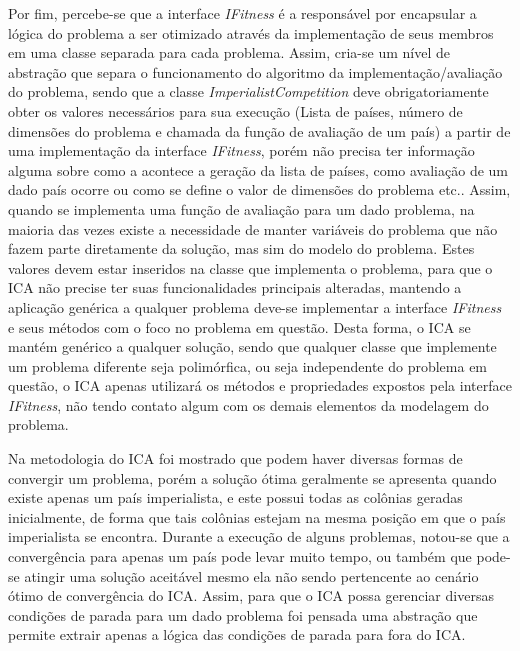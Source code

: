 Por fim, percebe-se que a interface \emph{IFitness} é a responsável por encapsular a lógica do problema a ser otimizado através da implementação de seus membros em uma classe separada para cada problema. Assim, cria-se um nível de abstração que separa o funcionamento do algoritmo da implementação/avaliação do problema, sendo que a classe \emph{ImperialistCompetition} deve obrigatoriamente obter os valores necessários para sua execução (Lista de países, número de dimensões do problema e chamada da função de avaliação de um país) a partir de uma implementação da interface \emph{IFitness}, porém não precisa ter informação alguma sobre como a acontece a geração da lista de países, como avaliação de um dado país ocorre ou como se define o valor de dimensões do problema etc.. Assim, quando se implementa uma função de avaliação para um dado problema, na maioria das vezes existe a necessidade de manter variáveis do problema que não fazem parte diretamente da solução, mas sim do modelo do problema. Estes valores devem estar inseridos na classe que implementa o problema, para que o ICA não precise ter suas funcionalidades principais alteradas, mantendo a aplicação genérica a qualquer problema deve-se implementar a interface \emph{IFitness} e seus métodos com o foco no problema em questão. Desta forma, o ICA se mantém genérico a qualquer solução, sendo que qualquer classe que implemente um problema diferente seja polimórfica, ou seja independente do problema em questão, o ICA apenas utilizará os métodos e propriedades expostos pela interface \emph{IFitness}, não tendo contato algum com os demais elementos da modelagem do problema.

Na metodologia do ICA foi mostrado que podem haver diversas formas de convergir um problema, porém a solução ótima geralmente se apresenta quando existe apenas um país imperialista, e este possui todas as colônias geradas inicialmente, de forma que tais colônias estejam na mesma posição em que o país imperialista se encontra. Durante a execução de alguns problemas, notou-se que a convergência para apenas um país pode levar muito tempo, ou também que pode-se atingir uma solução aceitável mesmo ela não sendo pertencente ao cenário ótimo de convergência do ICA. Assim, para que o ICA possa gerenciar diversas condições de parada para um dado problema foi pensada uma abstração que permite extrair apenas a lógica das condições de parada para fora do ICA.

